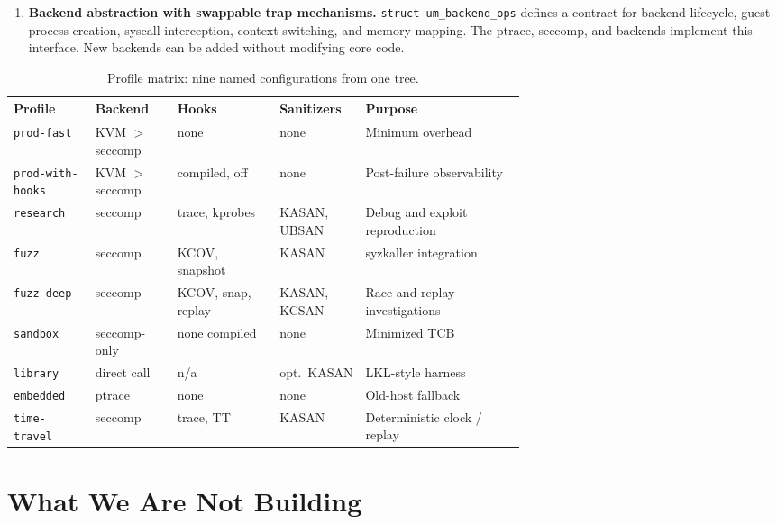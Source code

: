 \begin{enumerate}[leftmargin=2em]
  \item \textbf{Backend abstraction with swappable trap mechanisms.}
    \texttt{struct um\_backend\_ops} defines a contract for backend
    lifecycle, guest process creation, syscall interception, context
    switching, and memory mapping.  The ptrace, seccomp, and \KVMvTwo{}
    backends implement this interface.  New backends can be added
    without modifying core \UML{} code.
\end{enumerate}

\begin{table}[ht]
\centering
\caption{Profile matrix: nine named configurations from one tree.}
\label{tab:v2-profiles}
\small
\begin{tabularx}{\linewidth}{@{}p{0.16\linewidth}p{0.16\linewidth}p{0.20\linewidth}p{0.14\linewidth}Y@{}}
\toprule
Profile & Backend & Hooks & Sanitizers & Purpose \\
\midrule
\texttt{prod-fast}       & KVM $>$ seccomp & none            & none          & Minimum overhead \\
\texttt{prod-with-hooks} & KVM $>$ seccomp & compiled, off   & none          & Post-failure observability \\
\texttt{research}        & seccomp         & trace, kprobes  & KASAN, UBSAN  & Debug and exploit reproduction \\
\texttt{fuzz}            & seccomp         & KCOV, snapshot  & KASAN         & syzkaller integration \\
\texttt{fuzz-deep}       & seccomp         & KCOV, snap, replay & KASAN, KCSAN & Race and replay investigations \\
\texttt{sandbox}         & seccomp-only    & none compiled   & none          & Minimized TCB \\
\texttt{library}         & direct call     & n/a             & opt.\ KASAN   & LKL-style harness \\
\texttt{embedded}        & ptrace          & none            & none          & Old-host fallback \\
\texttt{time-travel}     & seccomp         & trace, TT       & KASAN         & Deterministic clock / replay \\
\bottomrule
\end{tabularx}
\end{table}


\section{What We Are Not Building}
\label{sec:v2-nongoals}

